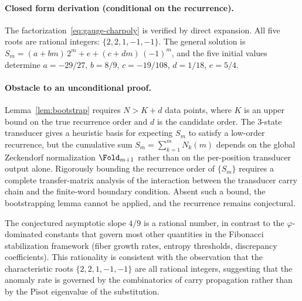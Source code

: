 \paragraph{Closed form derivation (conditional on the recurrence).}
The factorization~\eqref{eq:gauge-charpoly} is verified by direct expansion. All five roots are rational integers: $\{2,2,1,-1,-1\}$. The general solution is $S_m=(a+bm)\,2^m+e+(c+dm)\,(-1)^m$, and the five initial values determine $a=-29/27$, $b=8/9$, $c=-19/108$, $d=1/18$, $e=5/4$.

\paragraph{Obstacle to an unconditional proof.}
Lemma~\ref{lem:bootstrap} requires $N>K+d$ data points, where $K$ is an upper bound on the true recurrence order and $d$ is the candidate order. The $3$-state transducer gives a heuristic basis for expecting $S_m$ to satisfy a low-order recurrence, but the cumulative sum $S_m=\sum_{k=1}^m N_k(m)$ depends on the global Zeckendorf normalization $\Fold_{m+1}$ rather than on the per-position transducer output alone. Rigorously bounding the recurrence order of $\{S_m\}$ requires a complete transfer-matrix analysis of the interaction between the transducer carry chain and the finite-word boundary condition. Absent such a bound, the bootstrapping lemma cannot be applied, and the recurrence remains conjectural.

\begin{remark}\label{rem:rational-slope}
The conjectured asymptotic slope $4/9$ is a rational number, in contrast to the $\varphi$-dominated constants that govern most other quantities in the Fibonacci stabilization framework (fiber growth rates, entropy thresholds, discrepancy coefficients). This rationality is consistent with the observation that the characteristic roots $\{2,2,1,-1,-1\}$ are all rational integers, suggesting that the anomaly rate is governed by the combinatorics of carry propagation rather than by the Pisot eigenvalue of the substitution.
\end{remark}
